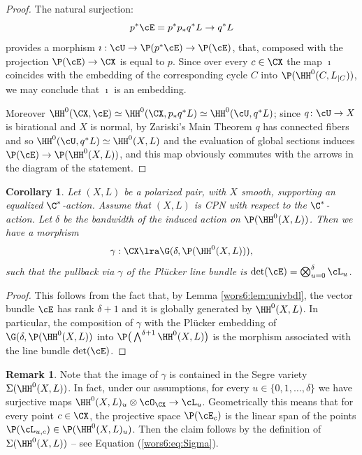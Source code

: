 \documentclass[reqno]{amsproc}
\newtheorem{corollary}[theorem]{Corollary}
\theoremstyle{definition}
\newtheorem{remark}[theorem]{Remark}
\begin{document}
\begin{proof}
The natural surjection:
$$
p^*\cE=p^*p_*q^*L\to q^*L
$$
provides a morphism $\imath:\cU\to\P(p^*\cE)\to \P(\cE)$, that, composed with the projection $\P(\cE)\to \CX$ is equal to $p$. Since over every $c\in\CX$ the map $\imath$ coincides with the embedding of the corresponding cycle $C$ into $\P(\HH^0(C,L_{|C}))$, we may conclude that $\imath$ is an embedding. 

Moreover $\HH^0(\CX,\cE)\simeq\HH^0(\CX,p_*q^*L)\simeq\HH^0(\cU,q^*L)$; since $q\colon \cU\to X$ is birational and $X$ is normal, by Zariski's Main Theorem $q$ has connected fibers and so $\HH^0(\cU,q^*L)\simeq \HH^0(X,L)$ and the evaluation of global sections induces $\P(\cE)\to \P(\HH^0(X,L))$, and this map obviously commutes with the arrows in the diagram of the statement.
\end{proof}

\begin{corollary}\label{wors6:cor:chowgrass}
Let $(X,L)$ be a polarized pair, with $X$ smooth, supporting an equalized $\C^*$-action. Assume that $(X,L)$ is CPN with respect to the $\C^*$-action. Let $\delta$ be the bandwidth of the induced action on $\P(\HH^0(X,L))$. Then we have a  
morphism $$\gamma:\CX\lra  
\G(\delta,\P(\HH^0(X,L))),$$
such that the pullback via $\gamma$ of the Pl\"ucker line bundle is $\det(\cE)=\bigotimes_{u=0}^\delta \cL_u$.
\end{corollary}

\begin{proof}
This follows from the fact that, by Lemma \ref{wors6:lem:univbdl}, the vector bundle $\cE$ has rank $\delta+1$ and it is globally generated by $\HH^0(X,L)$. In particular, the composition of  $\gamma$ with the Pl\"ucker embedding of $\G(\delta,\P(\HH^0(X,L))$ into $\P\big(\bigwedge^{\delta+1}\HH^0(X,L)\big)$ is the morphism associated with the line bundle $\det (\cE)$.
\end{proof}

\begin{remark}\label{wors6:rem:Sigma}
Note that the image of $\gamma$ is contained in the Segre variety $\Sigma(\HH^0(X,L))$. In fact, under our assumptions, for every $u\in\{0,1,\dots,\delta\}$ we have surjective maps $\HH^0(X,L)_u\otimes \cO_{\CX}\to \cL_u$. Geometrically this means that for every point $c\in\CX$, the projective space $\P(\cE_c)$ is the linear span of the points $\P(\cL_{u,c})\in\P(\HH^0(X,L)_u)$. Then the claim follows by the definition of $\Sigma(\HH^0(X,L))$ -- see Equation (\ref{wors6:eq:Sigma}). 
\end{remark}
\end{document}
